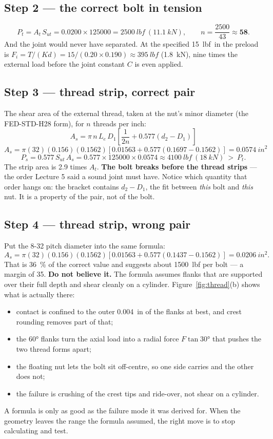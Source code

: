 \documentclass[11pt,a4paper]{article}
\begin{document}
\subsection*{Step 2 --- the correct bolt in tension}
\[
P_t=A_t\,S_{ut}=0.0200\times\num{125000}=\SI{2500}{lbf}\ (\SI{11.1}{kN}),\qquad n=\frac{2500}{43}\approx\mathbf{58}.
\]
And the joint would never have separated. At the specified \SI{15}{lbf.in} the preload is
$F_i=T/(Kd)=15/(0.20\times0.190)\approx\SI{395}{lbf}$ (\SI{1.8}{kN}), nine times the external
load before the joint constant $C$ is even applied.

\subsection*{Step 3 --- thread strip, correct pair}
The shear area of the external thread, taken at the nut's minor diameter (the FED-STD-H28 form),
for $n$ threads per inch:
\[
A_s=\pi\,n\,L_e\,D_1\left[\frac{1}{2n}+0.577\left(d_2-D_1\right)\right]
\]
\[
A_s=\pi(32)(0.156)(0.1562)\left[0.01563+0.577(0.1697-0.1562)\right]=\SI{0.0574}{in^2}
\]
\[
P_s=0.577\,S_{ut}\,A_s=0.577\times\num{125000}\times0.0574\approx\SI{4100}{lbf}\ (\SI{18}{kN})\ >\ P_t .
\]
The strip area is 2.9 times $A_t$. \textbf{The bolt breaks before the thread strips} --- the order
Lecture 5 said a sound joint must have. Notice which quantity that order hangs on: the bracket
contains $d_2-D_1$, the fit between \emph{this} bolt and \emph{this} nut. It is a property of the
pair, not of the bolt.

\subsection*{Step 4 --- thread strip, wrong pair}
Put the 8-32 pitch diameter into the same formula:
\[
A_s=\pi(32)(0.156)(0.1562)\left[0.01563+0.577(0.1437-0.1562)\right]=\SI{0.0206}{in^2}.
\]
That is \SI{36}{\percent} of the correct value and suggests about \SI{1500}{lbf} per bolt --- a
margin of 35. \textbf{Do not believe it.} The formula assumes flanks that are supported over their
full depth and shear cleanly on a cylinder. Figure~\ref{fig:thread}(b) shows what is actually
there:
\begin{itemize}[leftmargin=*,itemsep=1pt]
\item contact is confined to the outer \SI{0.004}{in} of the flanks at best, and crest rounding
  removes part of that;
\item the \ang{60} flanks turn the axial load into a radial force $F\tan\ang{30}$ that pushes the
  two thread forms apart;
\item the floating nut lets the bolt sit off-centre, so one side carries and the other does not;
\item the failure is crushing of the crest tips and ride-over, not shear on a cylinder.
\end{itemize}
A formula is only as good as the failure mode it was derived for. When the geometry leaves the
range the formula assumed, the right move is to stop calculating and test.
\end{document}
